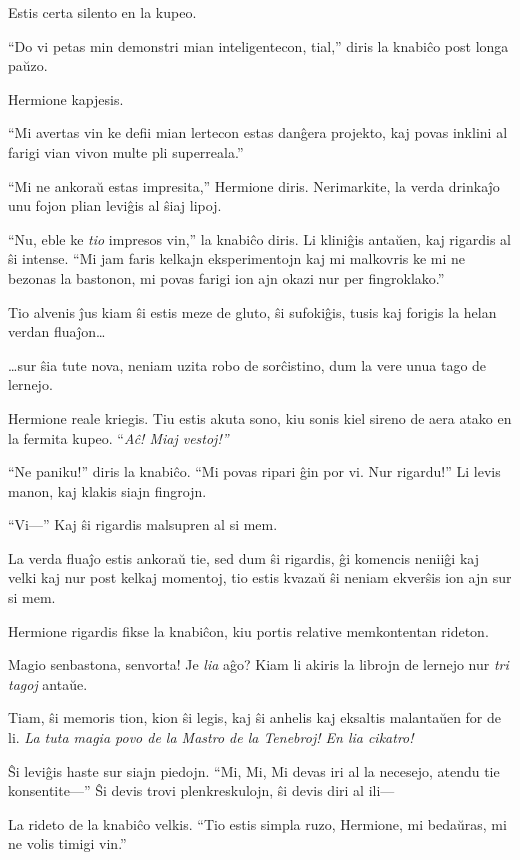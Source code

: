 Estis certa silento en la kupeo.

``Do vi petas min demonstri mian inteligentecon, tial,'' diris la
knabiĉo post longa paŭzo.

Hermione kapjesis.

``Mi avertas vin ke defii mian lertecon estas danĝera projekto, kaj
povas inklini al farigi vian vivon multe pli superreala.''

``Mi ne ankoraŭ estas impresita,'' Hermione diris. Nerimarkite, la
verda drinkaĵo unu fojon plian leviĝis al ŝiaj lipoj.

``Nu, eble ke \emph{tio} impresos vin,'' la knabiĉo diris. Li kliniĝis
antaŭen, kaj rigardis al ŝi intense. ``Mi jam faris kelkajn
eksperimentojn kaj mi malkovris ke mi ne bezonas la bastonon, mi povas
farigi ion ajn okazi nur per fingroklako.''

Tio alvenis ĵus kiam ŝi estis meze de gluto, ŝi sufokiĝis, tusis kaj
forigis la helan verdan fluaĵon\ldots

\ldots{}sur ŝia tute nova, neniam uzita robo de sorĉistino, dum la vere unua
tago de lernejo.

Hermione reale kriegis. Tiu estis akuta sono, kiu sonis kiel sireno de
aera atako en la fermita kupeo. ``\emph{Aĉ! Miaj vestoj!''}

``Ne paniku!'' diris la knabiĉo. ``Mi povas ripari ĝin por vi. Nur
rigardu!'' Li levis manon, kaj klakis siajn fingrojn.

``Vi—'' Kaj ŝi rigardis malsupren al si mem.

La verda fluaĵo estis ankoraŭ tie, sed dum ŝi rigardis, ĝi komencis
neniiĝi kaj velki kaj nur post kelkaj momentoj, tio estis kvazaŭ ŝi
neniam ekverŝis ion ajn sur si mem.

Hermione rigardis fikse la knabiĉon, kiu portis relative memkontentan
rideton.

Magio senbastona, senvorta! Je \emph{lia} aĝo? Kiam li akiris la
librojn de lernejo nur \emph{tri tagoj} antaŭe.

Tiam, ŝi memoris tion, kion ŝi legis, kaj ŝi anhelis kaj eksaltis
malantaŭen for de li. \emph{La tuta magia povo de la Mastro de la
  Tenebroj!  En lia cikatro!}

Ŝi leviĝis haste sur siajn piedojn. ``Mi, Mi, Mi devas iri al la
necesejo, atendu tie konsentite—'' Ŝi devis trovi plenkreskulojn, ŝi
devis diri al ili—

La rideto de la knabiĉo velkis. ``Tio estis simpla ruzo, Hermione, mi
bedaŭras, mi ne volis timigi vin.''

